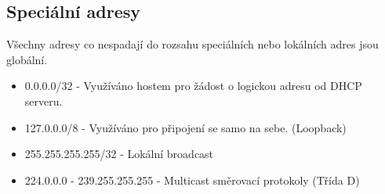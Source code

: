\subsection{Speciální adresy}
Všechny adresy co nespadají do rozsahu speciálních nebo lokálních adres jsou globální.\\
\begin{itemize}
  \item 0.0.0.0/32 - Využíváno hostem pro žádost o logickou adresu od DHCP serveru.
  \item 127.0.0.0/8 - Využíváno pro připojení se samo na sebe. (Loopback)
  \item 255.255.255.255/32 - Lokální broadcast
  \item 224.0.0.0 - 239.255.255.255 - Multicast směrovací protokoly (Třída D)
\end{itemize}
